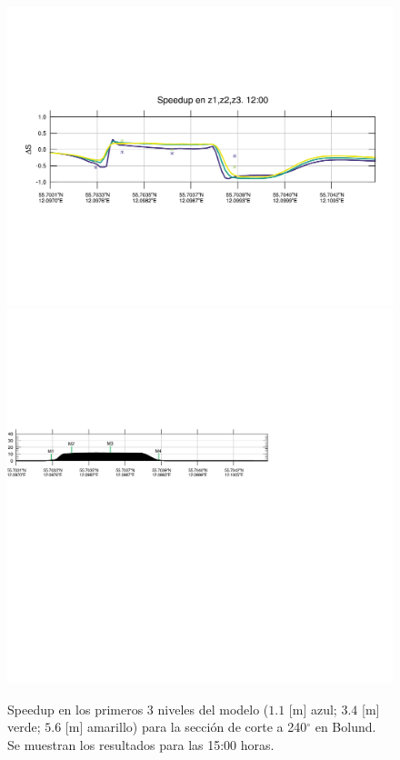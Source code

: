 \begin{figure}[H]
	\centering
	\includegraphics[width=0.9\linewidth,trim={12mm 84mm -5mm 74mm},page=37,clip]{Imagenes/06/bol/speedup}\\%
	\includegraphics[width=0.9\linewidth,trim={-11mm 205mm 100mm 112mm},clip]{Imagenes/06/bol/cross_height}\\%
	\caption{Speedup en los primeros 3 niveles del modelo ($1.1$ [m] azul; $3.4$ [m] verde; $5.6$ [m] amarillo) para la sección de corte a 240$^\circ$ en Bolund. Se muestran los resultados para las 15:00 horas.}
	\label{fig:06_bol_speedup}
\end{figure}

